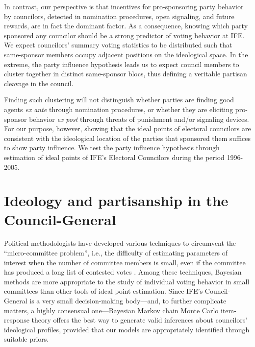 \documentclass[12 pt, letter]{article}
\begin{document}

In contrast, our perspective is that incentives for pro-sponsoring
party behavior by councilors, detected in nomination procedures,
open signaling, and future rewards, are in fact the dominant factor.
As a consequence, knowing which party sponsored any councilor should
be a strong predictor of voting behavior at IFE. We expect
councilors' summary voting statistics to be distributed such that
same-sponsor members occupy adjacent positions on the ideological
space. In the extreme, the party influence hypothesis leads us to
expect council members to cluster together in distinct same-sponsor
blocs, thus defining a veritable partisan cleavage in the council.

Finding such clustering will not distinguish whether parties are
finding good agents \emph{ex ante} through nomination procedures, or
whether they are eliciting pro-sponsor behavior \emph{ex post}
through threats of punishment and/or signaling devices.  For our
purpose, however, showing that the ideal points of electoral
councilors are consistent with the ideological location of the
parties that sponsored them suffices to show party influence. We
test the party influence hypothesis through estimation of ideal
points of IFE's Electoral Councilors during the period 1996-2005.


\singlespacing

\section{Ideology and partisanship in the Council-General}\label{S:estimation}

\doublespacing Political methodologists have developed various
techniques to circumvent the ``micro-committee problem'', i.e., the
difficulty of estimating parameters of interest when the number of
committee members is small, even if the committee has produced a
long list of contested votes \citep{Londregan2000}.  Among these
techniques, Bayesian methods \citep{Martin2002, Clinton2004,
Jackman2001} are more appropriate to the study of individual voting
behavior in small committees than other tools of ideal point
estimation.  Since IFE's Council-General is a very small
decision-making body---and, to further complicate matters, a highly
consensual one---Bayesian Markov chain Monte Carlo item-response
theory  offers the best way to generate valid inferences about
councilors' ideological profiles, provided that our models are
appropriately identified through suitable priors.
\end{document}
